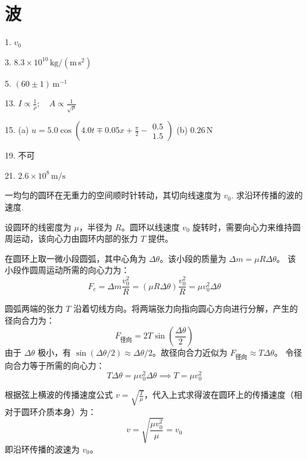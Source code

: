\chapter{波}

\begin{oddanswers}
1. $v_0$

3. $8.3 \times 10^{10}\,\mathrm{kg/(m\,s^2)}$

5. $(60 \pm 1)\,\mathrm{m^{-1}}$

13. $I \propto \frac{1}{\rho} ; \quad A \propto \frac{1}{\sqrt{\rho}}$

15. (a) $u = 5.0 \cos \left( 4.0t \mp 0.05x + \frac{\pi}{2} - \begin{matrix} 0.5 \\ 1.5 \end{matrix} \right)$
(b) $0.26\,\mathrm{N}$

19. 不可

21. $2.6 \times 10^8\,\mathrm{m/s}$
\end{oddanswers}

\begin{exercise}\label{ex:8.1}
一均匀的圆环在无重力的空间顺时针转动，其切向线速度为 $v_0$. 求沿环传播的波的速度.
\end{exercise}
\begin{solution}
设圆环的线密度为 $\mu$，半径为 $R$。圆环以线速度 $v_0$ 旋转时，需要向心力来维持圆周运动，该向心力由圆环内部的张力 $T$ 提供。

在圆环上取一微小段圆弧，其中心角为 $\Delta\theta$。该小段的质量为 $\Delta m = \mu R \Delta\theta$。
该小段作圆周运动所需的向心力为：
$$ F_c = \Delta m \frac{v_0^2}{R} = (\mu R \Delta\theta) \frac{v_0^2}{R} = \mu v_0^2 \Delta\theta $$

圆弧两端的张力 $T$ 沿着切线方向。将两端张力向指向圆心方向进行分解，产生的径向合力为：
$$ F_{\text{径向}} = 2T \sin\left(\frac{\Delta\theta}{2}\right) $$
由于 $\Delta\theta$ 极小，有 $\sin(\Delta\theta/2) \approx \Delta\theta/2$。故径向合力近似为 $F_{\text{径向}} \approx T \Delta\theta$。
令径向合力等于所需的向心力：
$$ T \Delta\theta = \mu v_0^2 \Delta\theta \implies T = \mu v_0^2 $$

根据弦上横波的传播速度公式 $v = \sqrt{\frac{T}{\mu}}$，代入上式求得波在圆环上的传播速度（相对于圆环介质本身）为：
$$ v = \sqrt{\frac{\mu v_0^2}{\mu}} = v_0 $$
即沿环传播的波速为 $v_0$。
\end{solution}

